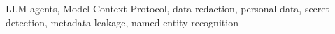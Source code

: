 LLM agents, Model Context Protocol, data redaction, personal data, secret detection, metadata leakage, named-entity recognition
